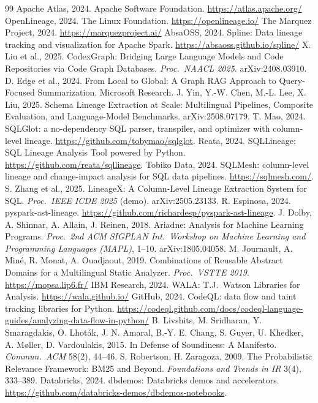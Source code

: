 \documentclass[11pt]{article}
\begin{document}
\begin{thebibliography}{99}
\small
{} Apache Atlas, 2024. Apache Software Foundation. \url{https://atlas.apache.org/}
 OpenLineage, 2024. The Linux Foundation. \url{https://openlineage.io/}
 The Marquez Project, 2024. \url{https://marquezproject.ai/}
 AbsaOSS, 2024. Spline: Data lineage tracking and visualization for Apache Spark. \url{https://absaoss.github.io/spline/}
 X. Liu et al., 2025. CodexGraph: Bridging Large Language Models and Code Repositories via Code Graph Databases. \emph{Proc.\ NAACL 2025}. arXiv:2408.03910.
 D. Edge et al., 2024. From Local to Global: A Graph RAG Approach to Query-Focused Summarization. Microsoft Research.
 J. Yin, Y.-W. Chen, M.-L. Lee, X. Liu, 2025. Schema Lineage Extraction at Scale: Multilingual Pipelines, Composite Evaluation, and Language-Model Benchmarks. arXiv:2508.07179.
 T. Mao, 2024. SQLGlot: a no-dependency SQL parser, transpiler, and optimizer with column-level lineage. \url{https://github.com/tobymao/sqlglot}.
 Reata, 2024. SQLLineage: SQL Lineage Analysis Tool powered by Python. \url{https://github.com/reata/sqllineage}.
 Tobiko Data, 2024. SQLMesh: column-level lineage and change-impact analysis for SQL data pipelines. \url{https://sqlmesh.com/}.
 S. Zhang et al., 2025. LineageX: A Column-Level Lineage Extraction System for SQL. \emph{Proc.\ IEEE ICDE 2025} (demo). arXiv:2505.23133.
 R. Espinosa, 2024. pyspark-ast-lineage. \url{https://github.com/richardesp/pyspark-ast-lineage}.
 J. Dolby, A. Shinnar, A. Allain, J. Reinen, 2018. Ariadne: Analysis for Machine Learning Programs. \emph{Proc.\ 2nd ACM SIGPLAN Int.\ Workshop on Machine Learning and Programming Languages (MAPL)}, 1--10. arXiv:1805.04058.
 M. Journault, A. Min\'e, R. Monat, A. Ouadjaout, 2019. Combinations of Reusable Abstract Domains for a Multilingual Static Analyzer. \emph{Proc.\ VSTTE 2019}. \url{https://mopsa.lip6.fr/}
 IBM Research, 2024. WALA: T.J.\ Watson Libraries for Analysis. \url{https://wala.github.io/}
 GitHub, 2024. CodeQL: data flow and taint tracking libraries for Python. \url{https://codeql.github.com/docs/codeql-language-guides/analyzing-data-flow-in-python/}
 B. Livshits, M. Sridharan, Y. Smaragdakis, O. Lhot\'ak, J. N. Amaral, B.-Y. E. Chang, S. Guyer, U. Khedker, A. M\o{}ller, D. Vardoulakis, 2015. In Defense of Soundiness: A Manifesto. \emph{Commun.\ ACM} 58(2), 44--46.
 S. Robertson, H. Zaragoza, 2009. The Probabilistic Relevance Framework: BM25 and Beyond. \emph{Foundations and Trends in IR} 3(4), 333--389.
 Databricks, 2024. dbdemos: Databricks demos and accelerators. \url{https://github.com/databricks-demos/dbdemos-notebooks}.
\end{thebibliography}
\end{document}

